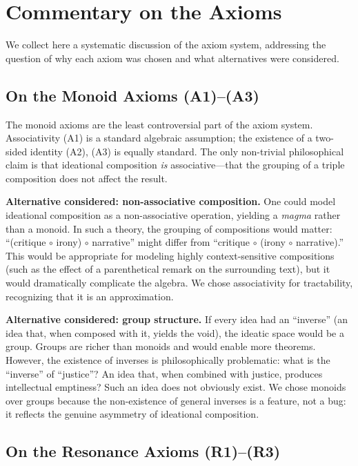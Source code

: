 \documentclass[11pt,openany]{book}
\theoremstyle{definition}
\theoremstyle{plain}
\theoremstyle{remark}
\newcommand{\compose}{\circ}                 %
\begin{document}
\section{Commentary on the Axioms}

We collect here a systematic discussion of the axiom system, addressing the question of why each axiom was chosen and what alternatives were considered.

\subsection{On the Monoid Axioms (A1)--(A3)}

The monoid axioms are the least controversial part of the axiom system. Associativity (A1) is a standard algebraic assumption; the existence of a two-sided identity (A2), (A3) is equally standard. The only non-trivial philosophical claim is that ideational composition \emph{is} associative---that the grouping of a triple composition does not affect the result.

\textbf{Alternative considered: non-associative composition.} One could model ideational composition as a non-associative operation, yielding a \emph{magma} rather than a monoid. In such a theory, the grouping of compositions would matter: ``(critique $\compose$ irony) $\compose$ narrative'' might differ from ``critique $\compose$ (irony $\compose$ narrative).'' This would be appropriate for modeling highly context-sensitive compositions (such as the effect of a parenthetical remark on the surrounding text), but it would dramatically complicate the algebra. We chose associativity for tractability, recognizing that it is an approximation.

\textbf{Alternative considered: group structure.} If every idea had an ``inverse'' (an idea that, when composed with it, yields the void), the ideatic space would be a group. Groups are richer than monoids and would enable more theorems. However, the existence of inverses is philosophically problematic: what is the ``inverse'' of ``justice''? An idea that, when combined with justice, produces intellectual emptiness? Such an idea does not obviously exist. We chose monoids over groups because the non-existence of general inverses is a feature, not a bug: it reflects the genuine asymmetry of ideational composition.

\subsection{On the Resonance Axioms (R1)--(R3)}
\end{document}
